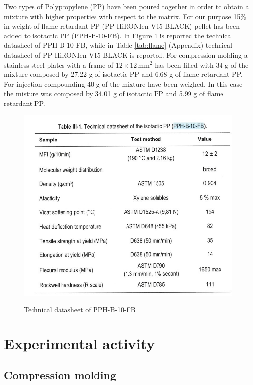 \documentclass[a4paper, 11pt]{article}
\begin{document}
Two types of Polypropylene (PP) have been poured together in order to obtain a mixture with higher properties with respect to the matrix. For our purpose 15\% in weight of flame retardant PP (PP HiRONIen V15 BLACK) pellet has been added to isotactic PP (PPH-B-10-FB). In Figure \ref{fig:datasheet} is reported the technical datasheet of PPH-B-10-FB, while in Table \ref{tab:flame} (Appendix) technical datasheet of PP HiRONIen V15 BLACK is reported.
For compression molding a stainless steel plates with a frame of $12\times 12\, \text{mm}^2$ has been filled with 34 g of the mixture composed by 27.22 g of isotactic PP and 6.68 g of flame retardant PP. 
For injection compounding 40 g of the mixture have been weighed. In this case the misture was composed by 34.01 g of isotactic PP and 5.99 g of flame retardant PP.
\begin{figure}[h!]
	\centering
	{\includegraphics[scale=0.6]{datasheetPP}}
	\captionsetup{justification=centering}
	\caption{Technical datasheet of PPH-B-10-FB}
	\label{fig:datasheet}
\end{figure}

\section{Experimental activity}

\subsection{Compression molding}
\end{document}
